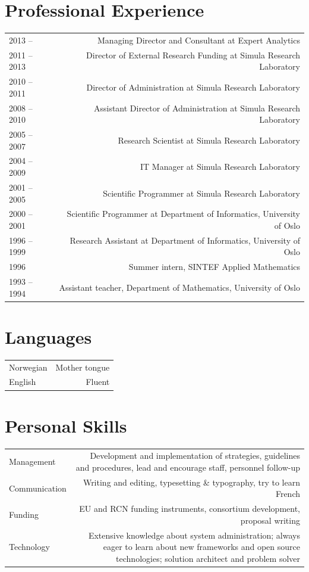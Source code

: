 \documentclass[english,a4paper,11pt]{article}
\begin{document}
\section*{Professional Experience}
\begin{tabular}{LR}
2013 --      & Managing Director and Consultant at Expert Analytics \\
2011 -- 2013 & Director of External Research Funding at Simula Research Laboratory \\
2010 -- 2011 & Director of Administration at Simula Research Laboratory \\
2008 -- 2010 & Assistant Director of Administration at Simula Research Laboratory \\
2005 -- 2007 & Research Scientist at Simula Research Laboratory \\
2004 -- 2009 & IT Manager at Simula Research Laboratory \\
2001 -- 2005 & Scientific Programmer at Simula Research Laboratory \\
2000 -- 2001 & Scientific Programmer at Department of Informatics, University of Oslo \\
1996 -- 1999 & Research Assistant at Department of Informatics, University of Oslo \\
1996         & Summer intern, SINTEF Applied Mathematics \\
1993 -- 1994 & Assistant teacher, Department of Mathematics, University of Oslo \\
\end{tabular}

\section*{Languages}
\begin{tabular}{LR}
Norwegian & Mother tongue \\
English & Fluent \\
\end{tabular}

\section*{Personal Skills}
\begin{tabular}{LR}
Management & Development and implementation of strategies, guidelines and procedures, lead and encourage staff, personnel follow-up \\
Communication & Writing and editing, typesetting \& typography, try to learn French \\
Funding & EU and RCN funding instruments, consortium development, proposal writing \\
Technology & Extensive knowledge about system administration; always eager to learn about new frameworks and open source technologies; solution architect and problem solver \\
\end{tabular}
\end{document}
